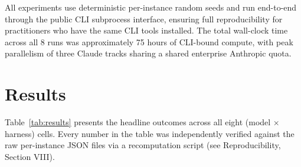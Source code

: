 \documentclass[journal]{IEEEtran}
\begin{document}
All experiments use deterministic per-instance random seeds and run end-to-end through the public CLI subprocess interface, ensuring full reproducibility for practitioners who have the same CLI tools installed. The total wall-clock time across all 8 runs was approximately 75 hours of CLI-bound compute, with peak parallelism of three Claude tracks sharing a shared enterprise Anthropic quota.

\section{Results}

Table~\ref{tab:results} presents the headline outcomes across all eight (model $\times$ harness) cells. Every number in the table was independently verified against the raw per-instance JSON files via a recomputation script (see Reproducibility, Section VIII).
\end{document}
